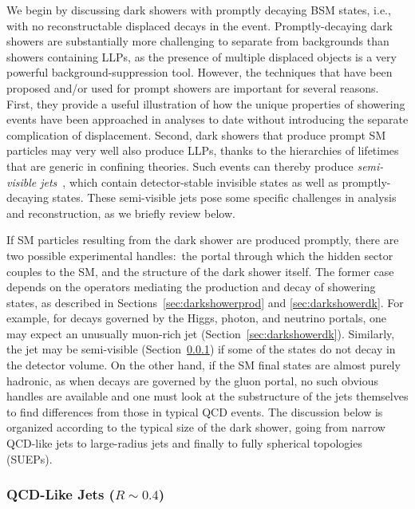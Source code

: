 We begin by discussing dark showers with promptly decaying BSM states, i.e., with no reconstructable displaced decays in the event. Promptly-decaying dark showers are substantially more challenging to separate from backgrounds than showers containing LLPs, as the presence of multiple displaced objects is a very powerful background-suppression tool. However, the techniques that have been proposed and/or used for prompt showers are important for several reasons. First, they provide a useful illustration of how the unique properties of showering events have been approached in analyses to date without introducing the separate complication of displacement. Second, dark showers that produce prompt SM particles may very well also produce LLPs, thanks to the hierarchies of lifetimes that are generic in confining theories.  Such events can thereby produce {\em semi-visible jets}~\cite{Cohen:2015toa}, which contain detector-stable invisible states as well as promptly-decaying states. These semi-visible jets pose some specific challenges in analysis and reconstruction, as we briefly review below.

If SM particles resulting from the dark shower are produced promptly, there are two possible experimental handles:~the portal through which the hidden sector couples to the SM, and the structure of the dark shower itself.
The former case  depends on the operators mediating the production and decay of showering states, as described in Sections~\ref{sec:darkshowerprod} and \ref{sec:darkshowerdk}.
For example, for decays governed by the Higgs, photon, and neutrino portals, one may expect an unusually muon-rich jet (Section~\ref{sec:darkshowerdk}). Similarly, the jet may be semi-visible (Section~\ref{sec:darkshowerthinjet}) if some of the states do not decay in the detector volume. On the other hand, if the SM final states are almost purely hadronic, as when decays are governed by the gluon portal, no such obvious handles are available and one must look at the substructure of the jets themselves to find differences from those in typical QCD events. The discussion below is organized according to the typical size of the dark shower, going from narrow QCD-like jets to large-radius jets and finally to fully spherical topologies (SUEPs).

\subsubsection{QCD-Like Jets ($R \sim 0.4$)}
\label{sec:darkshowerthinjet}

